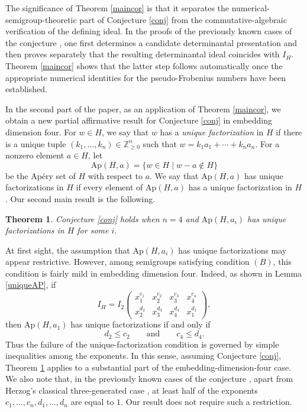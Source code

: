 \documentclass[12pt]{amsart}
\numberwithin{equation}{section}
\newtheorem{theorem}{Theorem}[section]
\theoremstyle{definition}
\newcommand{\Ap}{\mathrm{Ap}}
\begin{document}
The significance of Theorem \ref{maincor} is that it separates the numerical-semigroup-theoretic part of Conjecture \ref{conj} from the commutative-algebraic verification of the defining ideal. 
In the proofs of the previously known cases of the conjecture \cite{GKMT,KM,KMO,Ta}, one first determines a candidate determinantal presentation and then proves separately that the resulting determinantal ideal coincides with $I_H$.
Theorem \ref{maincor} shows that the latter step follows automatically once the appropriate numerical identities for the pseudo-Frobenius numbers have been established.

In the second part of the paper,
as an application of Theorem \ref{maincor}, we obtain a new partial affirmative result for Conjecture \ref{conj} in embedding dimension four.
For $w\in H$, we say that $w$ has a \emph{unique factorization} in $H$ if there is a unique tuple
$(k_1,\dots,k_n)\in\mathbb Z_{\geq0}^n$
such that
$
w=k_1a_1+\cdots+k_n a_n.
$
For a nonzero element $a\in H$, let
\[
\Ap(H,a)
=
\{w\in H\mid w-a\notin H\}
\]
be the Ap\'ery set of $H$ with respect to $a$.
We say that $\Ap(H,a)$ has unique factorizations in $H$ if every element of $\Ap(H,a)$ has a unique factorization in $H$.
Our second main result is the following.

\begin{theorem}
\label{secondthm}
Conjecture \ref{conj} holds when $n=4$ and $\Ap(H,a_i)$ has unique factorizations in $H$ for some $i$.
\end{theorem}

At first sight, the assumption that $\Ap(H,a_i)$ has unique factorizations may appear restrictive. However, among semigroups satisfying condition $(B)$, this condition is fairly mild in embedding dimension four. Indeed, as shown in Lemma \ref{uniqueAP}, if
\[
I_H
=
I_2
\begin{pmatrix}
x_1^{c_1} & x_2^{c_2} & x_3^{c_3} & x_4^{c_4}\\
x_2^{d_2} & x_3^{d_3} & x_4^{d_4} & x_1^{d_1}
\end{pmatrix},
\]
then $\Ap(H,a_1)$ has unique factorizations if and only if
\[
d_2\leq c_2
\qquad\text{and}\qquad
c_4\leq d_4.
\]
Thus the failure of the unique-factorization condition is governed by simple inequalities among the exponents. In this sense, assuming Conjecture \ref{conj}, Theorem \ref{secondthm} applies to a substantial part of the embedding-dimension-four case.
We also note that, in the previously known cases of the conjecture \cite{GKMT,KM,KMO,Ta}, apart from Herzog's classical three-generated case \cite{Herzog}, at least half of the exponents $c_1,\dots,c_n,d_1,\dots,d_n$ are equal to $1$. Our result does not require such a restriction.
\end{document}
